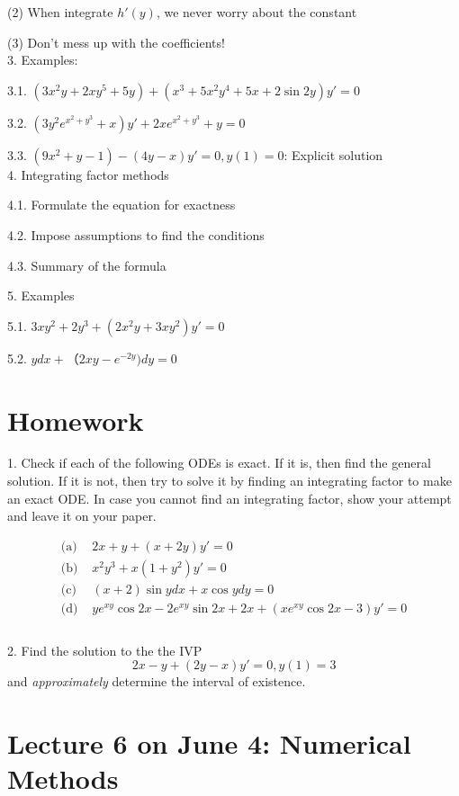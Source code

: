 \documentclass[11pt]{article}
\begin{document}
(2) When integrate $h'(y)$, we never worry about the constant 

(3) Don't mess up with the coefficients! \\

3. Examples: 

3.1. $(3x^2y+ 2xy^5+ 5y) + (x^3+ 5x^2y^4+ 5x+2\sin 2y)y'=0$\

3.2. $(3y^2e^{x^2+y^3}+x)y' + 2x e^{x^2 + y^3} + y = 0$

3.3. $(9x^2 + y - 1) - (4y-x)y' = 0, y(1) = 0$: Explicit solution\\

4. Integrating factor methods

4.1. Formulate the equation for exactness

4.2. Impose assumptions to find the conditions

4.3. Summary of the formula 

5. Examples 

5.1. $3xy^2+2y^3 + (2x^2y +3xy^2)y'=0$

5.2. $ydx + （2xy-e^{-2y})dy=0$

\newpage
\section*{Homework}

1. Check if each of the following ODEs is exact. If it is, then find the general solution. If it is not, then try to solve it by finding an integrating factor to make an exact ODE. In case you cannot find an integrating factor, show your attempt and leave it on your paper. 

$$\begin{aligned} 
\text{(a) } & 2x+y+(x+2y)y' = 0 \\
\text{(b) } & x^2 y^3 + x(1+y^2)y' = 0\\
\text{(c) } & (x+2)\sin y dx + x\cos y dy = 0\\
\text{(d) } & ye^{xy}\cos 2x -2e^{xy}\sin 2x + 2x + (xe^{xy}\cos 2x-3)y' = 0\\
\end{aligned}
$$~\\


2. Find the solution to the the IVP 
$$2x-y + (2y-x)y' = 0, y(1) = 3$$
and \textit{approximately} determine the interval of existence. 


\newpage

\section{Lecture 6 on June 4: Numerical Methods}
\end{document}
